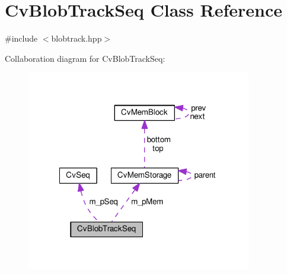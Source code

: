 \hypertarget{classCvBlobTrackSeq}{\section{Cv\-Blob\-Track\-Seq Class Reference}
\label{classCvBlobTrackSeq}
}


{\ttfamily \#include $<$blobtrack.\-hpp$>$}



Collaboration diagram for Cv\-Blob\-Track\-Seq\-:\nopagebreak
\begin{figure}[H]
\begin{center}
\leavevmode
\includegraphics[width=278pt]{classCvBlobTrackSeq__coll__graph}
\end{center}
\end{figure}
